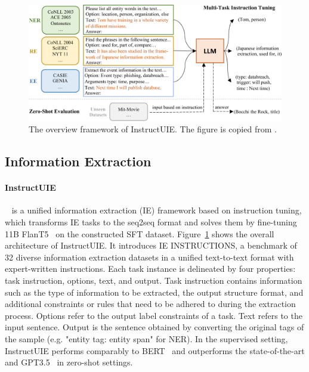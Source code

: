 \documentclass[11pt]{article}
\begin{document}
\begin{figure}[t]
  \centering
  \begin{minipage}[t]{0.5\textwidth}
    \centering
    \includegraphics[width=1\textwidth]{figures/InstructUIE.png}
  \end{minipage}%
  \caption{The overview framework of InstructUIE. The figure is copied from \citet{Wang2023InstructUIEMI}.}
  \label{fig:InstructUIE}
\end{figure}

\subsection{Information Extraction}
\paragraph{InstructUIE}~\citep{Wang2023InstructUIEMI} is a unified information extraction (IE) framework based on instruction tuning, which transforms IE tasks to the seq2seq format and solves them by fine-tuning 11B FlanT5~\citep{Chung2022ScalingIL} on the constructed SFT dataset. Figure~\ref{fig:InstructUIE} shows the overall architecture of InstructUIE. It introduces IE INSTRUCTIONS, a benchmark of 32 diverse information extraction datasets in a unified text-to-text format with expert-written instructions. Each task instance is delineated by four properties: task instruction, options, text, and output. Task instruction contains information such as the type of information to be extracted, the output structure format, and additional constraints or rules that need to be adhered to during the extraction process. Options refer to the output label constraints of a task.
Text refers to the input sentence. Output is the sentence obtained by  converting the original tags of the sample (e.g. "entity tag: entity span" for NER). In the supervised setting, InstructUIE performs comparably to BERT~\citep{devlin-etal-2019-bert} and outperforms the state-of-the-art and GPT3.5~\citep{brown2020language} in zero-shot settings.
\end{document}
